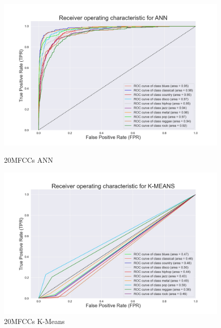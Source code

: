 \documentclass[conference]{IEEEtran}
\begin{document}
\begin{figure}[!ht]
\begin{center}
\begin{minipage}[t]{.24\textwidth}
        \end{minipage}
        \begin{minipage}[t]{.24\textwidth}
            \centering
            \includegraphics[width=\textwidth]{plot/SL/all_features/20/ANN_20MFCC_10000_10GEN_GTZAN - ROC Plot.jpg}
            \caption{20MFCCs ANN}
            \label{fig:20MFCCs ANN Time+frequency Features}
        \end{minipage}
        \begin{minipage}[t]{.24\textwidth}
            \centering
            \includegraphics[width=\textwidth]{plot/UL/all_features/20/20MFCC_10000_10GEN_GTZAN - ROC Plot.jpg}
            \caption{20MFCCs K-Means}
            \label{fig:20MFCCs K-Means Time+frequency Features}
        \end{minipage}
    \end{center}
\end{figure}
\end{document}
